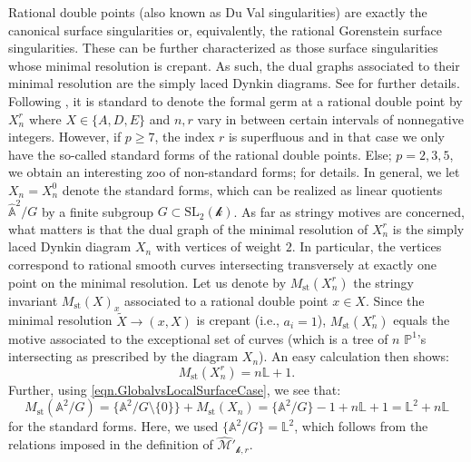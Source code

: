 \documentclass[12pt]{amsart}
\theoremstyle{plain}   %
\theoremstyle{definition}    %
\theoremstyle{remark}    %
\numberwithin{equation}{theorem}
\DeclareMathOperator{\st}{\mathrm{st}}
\newcommand{\kay}{\mathcal{k}}
\newcommand{\sM}{\mathcal{M}}
\newcommand{\bA}{\mathbb{A}}
\newcommand{\bL}{\mathbb{L}}
\begin{document}
\begin{example}
Rational double points (also known as Du Val singularities) are exactly the canonical surface singularities or, equivalently, the rational Gorenstein surface singularities. These can be further characterized as those surface singularities whose minimal resolution is crepant. As such, the dual graphs associated to their minimal resolution are the simply laced Dynkin diagrams. See \cite[Example 3.26]{KollarSingulaitieofMMP} for further details. Following \cite[\S 3]{ArtinCoveringsOfTheRtionalDoublePointsInCharacteristicp}, it is standard to denote the formal germ at a rational double point by $X_n^r$ where $X\in \{A,D,E\}$ and $n,r$ vary in between certain intervals of nonnegative integers. However, if $p\geq 7$, the index $r$ is superfluous and in that case we only have the so-called standard forms of the rational double points. Else; $p=2,3,5$, we obtain an interesting zoo of non-standard forms; \cite[Ibid.]{ArtinCoveringsOfTheRtionalDoublePointsInCharacteristicp} for details. In general, we let $X_n=X^0_n$ denote the standard forms, which can be realized as linear quotients $\hat{\bA}^2/G$ by a finite subgroup $G \subset \mathrm{SL}_2(\kay)$. As far as stringy motives are concerned, what matters is that the dual graph of the minimal resolution of $X_n^r$ is the simply laced Dynkin diagram $X_n$ with vertices of weight $2$. In particular, the vertices correspond to rational smooth curves intersecting transversely at exactly one point on the minimal resolution.  Let us denote by $M_{\mathrm{st}}(X_n^r)$ the stringy invariant $M_{\mathrm{st}}(X)_x$ associated to a rational double point $x \in X$. Since the minimal resolution $\tilde{X} \to (x, X)$ is crepant (i.e., $a_i=1$), $M_{\mathrm{st}}(X_n^r)$ equals the motive associated to the exceptional set of curves (which is a tree of $n$ $\mathbb{P}^1$'s intersecting as prescribed by the diagram $X_n$). An easy calculation then shows:
\[
M_{\mathrm{st}}(X_n^r) = n \bL + 1.
\]
Further, using \autoref{eqn.GlobalvsLocalSurfaceCase}, we see that:
\[
M_{\st}(\bA^2/G) = \big\{ \bA^2/G \setminus \{0\}  \big\} + M_{\st}(X_n) = \{\bA^2/G \} -1 + n \bL +1 = \bL^2+n\bL 
\]
for the standard forms. Here, we used $\{\bA^2/G \} = \bL ^2$, which follows from the relations imposed in the definition of $\hat{\sM}'_{\kay,r}$. 


\end{example}
\end{document}
